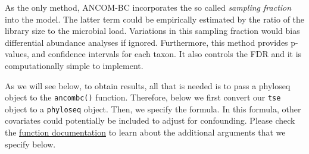 \documentclass[
  oneside]{book}
\newenvironment{Shaded}{\begin{snugshade}}{\end{snugshade}}
\newcommand{\CommentTok}[1]{\textcolor[rgb]{0.56,0.35,0.01}{\textit{#1}}}
\newcommand{\DataTypeTok}[1]{\textcolor[rgb]{0.13,0.29,0.53}{#1}}
\newcommand{\DecValTok}[1]{\textcolor[rgb]{0.00,0.00,0.81}{#1}}
\newcommand{\FloatTok}[1]{\textcolor[rgb]{0.00,0.00,0.81}{#1}}
\newcommand{\KeywordTok}[1]{\textcolor[rgb]{0.13,0.29,0.53}{\textbf{#1}}}
\newcommand{\NormalTok}[1]{#1}
\newcommand{\OperatorTok}[1]{\textcolor[rgb]{0.81,0.36,0.00}{\textbf{#1}}}
\newcommand{\OtherTok}[1]{\textcolor[rgb]{0.56,0.35,0.01}{#1}}
\newcommand{\StringTok}[1]{\textcolor[rgb]{0.31,0.60,0.02}{#1}}
\begin{document}
As the only method, ANCOM-BC incorporates the so called \emph{sampling fraction} into the model.
The latter term could be empirically estimated by the ratio of the library size to the microbial load.
Variations in this sampling fraction would bias differential abundance analyses if ignored.
Furthermore, this method provides p-values, and confidence intervals for each taxon.
It also controls the FDR and it is computationally simple to implement.

As we will see below, to obtain results, all that is needed is to pass
a phyloseq object to the \texttt{ancombc()} function. Therefore, below we first convert
our \texttt{tse} object to a \texttt{phyloseq} object. Then, we specify the formula. In this formula,
other covariates could potentially be included to adjust for confounding.
Please check the \href{https://rdrr.io/github/FrederickHuangLin/ANCOMBC/man/ancombc.html}{function documentation}
to learn about the additional arguments that we specify below.

\begin{Shaded}
\end{Shaded}
\end{document}
